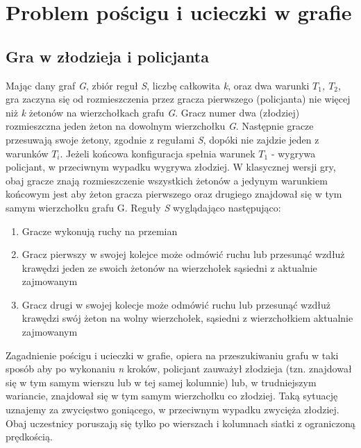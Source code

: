 \documentclass[brudnopis]{xmgr}
\begin{document}
\chapter{Problem pościgu i ucieczki w grafie}
\section{Gra w złodzieja i policjanta}
Mając dany graf \textit{G}, zbiór reguł \textit{S}, liczbę całkowita \textit{k}, oraz dwa warunki \textit{$T_1$, $T_2$}, gra zaczyna się od rozmieszczenia przez gracza pierwszego (policjanta) nie więcej niż \textit{k} żetonów na wierzchołkach grafu \textit{G}. Gracz numer dwa (złodziej) rozmieszczna jeden żeton na dowolnym wierzchołku \textit{G}. Następnie gracze przesuwają swoje żetony, zgodnie z regułami \textit{S}, dopóki nie zajdzie jeden z warunków $T_i$. Jeżeli końcowa konfiguracja spełnia warunek $T_1$ - wygrywa policjant, w przeciwnym wypadku wygrywa złodziej. W klasycznej wersji gry, obaj gracze znają rozmieszczenie wszystkich żetonów a jedynym warunkiem końcowym jest aby żeton gracza pierwszego oraz drugiego znajdował się w tym samym wierzchołku grafu G.
Reguły \textit{S} wyglądająco następująco:
\begin{enumerate}
  \item Gracze wykonują ruchy na przemian
  \item Gracz pierwszy w swojej kolejce może odmówić ruchu lub przesunąć wzdłuż krawędzi jeden ze swoich żetonów na wierzchołek sąsiedni z aktualnie zajmowanym
  \item Gracz drugi w swojej kolecje może odmówić ruchu lub przesunąć wzdłuż krawędzi swój żeton na wolny wierzchołek, sąsiedni z wierzchołkiem aktualnie zajmowanym
\end{enumerate}

Zagadnienie pościgu i ucieczki w grafie, opiera na przeszukiwaniu grafu w taki sposób aby po wykonaniu \textit{n} kroków, policjant zauważył złodzieja (tzn. znajdował się w tym samym wierszu lub w tej samej kolumnie) lub, w trudniejszym wariancie, znajdował się w tym samym wierzchołku co złodziej. Taką sytuację uznajemy za zwycięstwo goniącego, w przeciwnym wypadku zwycięża złodziej. Obaj uczestnicy poruszają się tylko po wierszach i kolumnach siatki z ograniczoną prędkością.
\end{document}
